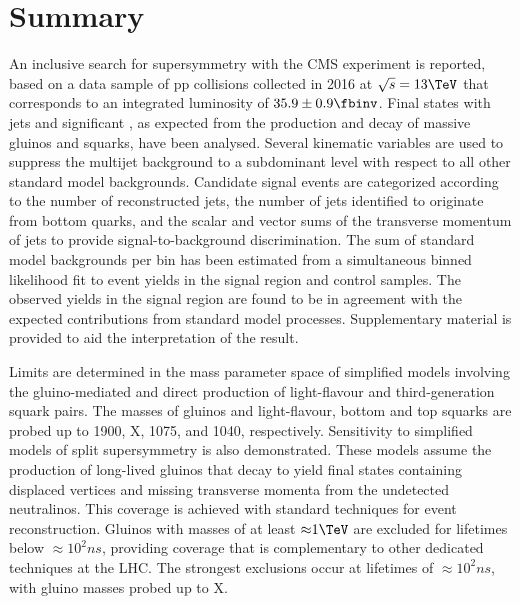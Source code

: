 \clearpage
\section{Summary}
\label{sec:summary}

An inclusive search for supersymmetry with the CMS experiment is
reported, based on a data sample of pp collisions collected in 2016 at
$\sqrt{s} = 13\TeV$ that corresponds to an integrated luminosity of
$35.9 \pm 0.9 \fbinv$. Final states with jets and significant
\ptvecmiss, as expected from the production and decay of massive
gluinos and squarks, have been analysed. Several kinematic variables
are used to suppress the multijet background to a subdominant level
with respect to all other standard model backgrounds. Candidate signal
events are categorized according to the number of reconstructed jets,
the number of jets identified to originate from bottom quarks, and the
scalar and vector sums of the transverse momentum of jets to provide
signal-to-background discrimination. The sum of standard model
backgrounds per bin has been estimated from a simultaneous binned
likelihood fit to event yields in the signal region and control
samples. The observed yields in the signal region are found to be in
agreement with the expected contributions from standard model
processes. Supplementary material is provided to aid the
interpretation of the result.

Limits are determined in the mass parameter space of simplified models
involving the gluino-mediated and direct production of light-flavour
and third-generation squark pairs. The masses of gluinos and
light-flavour, bottom and top squarks are probed up to 1900, X, 1075,
and 1040\GeV, respectively. Sensitivity to simplified models of split
supersymmetry is also demonstrated. These models assume the production
of long-lived gluinos that decay to yield final states containing
displaced vertices and missing transverse momenta from the undetected
neutralinos. This coverage is achieved with standard techniques for
event reconstruction. Gluinos with masses of at least ${\approx}1\TeV$
are excluded for lifetimes below ${\approx}10^{2}\unit{ns}$, providing
coverage that is complementary to other dedicated techniques at the
LHC. The strongest exclusions occur at lifetimes of
${\approx}10^{2}\unit{ns}$, with gluino masses probed up to X\TeV.


